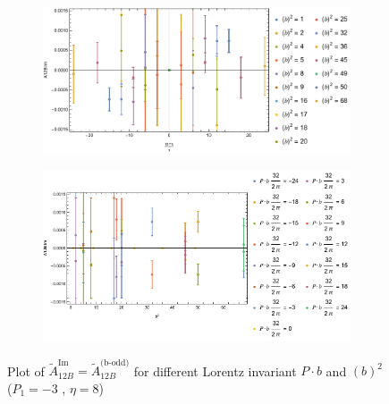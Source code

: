 \documentclass[]{article}
\numberwithin{equation}{section}
\newcommand{\tAmp}{\widetilde{A}}
\newcommand{\tAmp}{\ensuremath{\widetilde{A}^{(+)}}}
\begin{document}
\begin{figure}[h!]
     \centering
     \begin{subfigure}[b]{0.45\textwidth}
         \centering
         \includegraphics[width=\textwidth]{Amp_plots/bP_A12B_b_odd_P1_-3_eta_8.pdf}
     \end{subfigure}
     \begin{subfigure}[b]{0.45\textwidth}
         \centering
         \includegraphics[width=\textwidth]{Amp_plots/bsq_A12B_b_odd_P1_-3_eta_8.pdf}
     \end{subfigure}
        \caption{Plot of $\tAmp^{\text{Im}}_{12B}=\tAmp^{\text{(b-odd)}}_{12B}$ for different Lorentz invariant $P\cdot b$ and $(b)^2$  ($P_{1} = -3$ , $\eta=8$)}
\end{figure}
\end{document}
